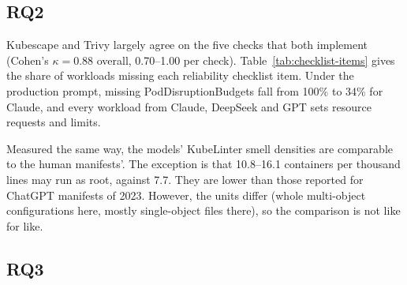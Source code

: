 \begin{table}[t]
\centering\small
\caption{RQ1 at project level: Hodges--Lehmann difference (model $-$ human) with exact 95\% CI, over the projects' mean neutral-prompt scores ($n=7$ projects; Qwen $n=5$). Rates in percentage points. A project's smoke-test rate takes values in thirds, so that column is coarse.}\label{tab:rq1-hl}
\end{table}

\subsection{RQ2}

Kubescape and Trivy largely agree on the five checks that both implement (Cohen's $\kappa=0.88$ overall, 0.70--1.00 per check). Table~\ref{tab:checklist-items} gives the share of workloads missing each reliability checklist item. Under the production prompt, missing PodDisruptionBudgets fall from 100\% to 34\% for Claude, and every workload from Claude, DeepSeek and GPT sets resource requests and limits.



Measured the same way, the models' KubeLinter smell densities are comparable to the human manifests'. The exception is that 10.8--16.1 containers per thousand lines may run as root, against 7.7. They are lower than those \citet{zhang2024genaismells} reported for ChatGPT manifests of 2023. However, the units differ (whole multi-object configurations here, mostly single-object files there), so the comparison is not like for like.

\subsection{RQ3}

